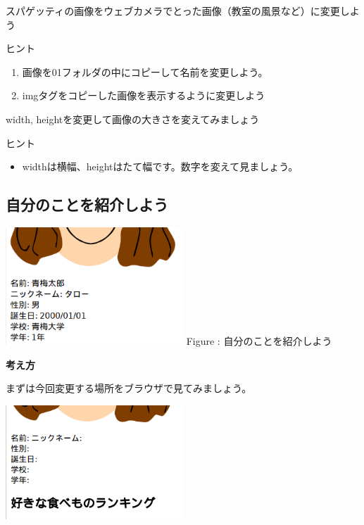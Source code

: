 \documentclass[a4paper,12pt]{jarticle}
\begin{document}
\theQuestion

スパゲッティの画像をウェブカメラでとった画像（教室の風景など）に変更しよう

ヒント

\begin{enumerate}
  \item
        画像を01フォルダの中にコピーして名前を変更しよう。
  \item
        imgタグをコピーした画像を表示するように変更しよう
\end{enumerate}
\theQuestion\label{Q:hasAnswer04-3}

width,
heightを変更して画像の大きさを変えてみましょう

ヒント

\begin{itemize}
  \item
        widthは横幅、heightはたて幅です。数字を変えて見ましょう。
\end{itemize}


\clearpage
{}
\subsection{\theExercise 自分のことを紹介しよう}
\centering
\begin{minipage}{\textwidth}
  \includegraphics[width=0.5\textwidth]{textbook-img173.png}
  \newline
  Figure : 自分のことを紹介しよう
\end{minipage}

\bigskip

\flushleft

\textbf{考え方}


\bigskip

まずは今回変更する場所をブラウザで見てみましょう。

\includegraphics[width=0.5\textwidth]{textbook-img175.png}
\end{document}
